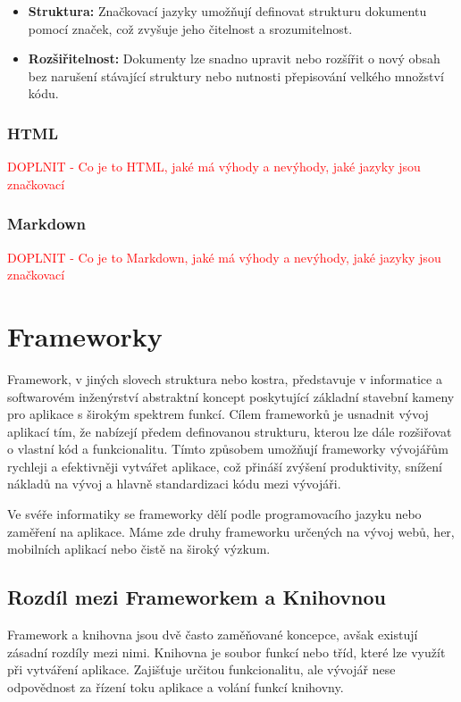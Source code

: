 \begin{itemize}
    \item \textbf{Struktura:} Značkovací jazyky umožňují definovat strukturu dokumentu pomocí značek, což zvyšuje jeho čitelnost a srozumitelnost.
    \item \textbf{Rozšiřitelnost:} Dokumenty lze snadno upravit nebo rozšířit o nový obsah bez narušení stávající struktury nebo nutnosti přepisování velkého množství kódu.
\end{itemize}

\subsubsection{HTML}
\label{subsubsec:languages-markup-html}
\textcolor{red}{DOPLNIT - Co je to HTML, jaké má výhody a nevýhody, jaké jazyky jsou značkovací}

\subsubsection{Markdown}
\label{subsubsec:languages-markup-markdown}
\textcolor{red}{DOPLNIT - Co je to Markdown, jaké má výhody a nevýhody, jaké jazyky jsou značkovací}

\section{Frameworky}
\label{sec:dev-framework}
Framework, v jiných slovech struktura nebo kostra, představuje v informatice a softwarovém inženýrství abstraktní koncept poskytující základní stavební kameny pro aplikace s širokým spektrem funkcí. Cílem frameworků je usnadnit vývoj aplikací tím, že nabízejí předem definovanou strukturu, kterou lze dále rozšiřovat o vlastní kód a funkcionalitu. Tímto způsobem umožňují frameworky vývojářům rychleji a efektivněji vytvářet aplikace, což přináší zvýšení produktivity, snížení nákladů na vývoj a hlavně standardizaci kódu mezi vývojáři.

Ve svéře informatiky se frameworky dělí podle programovacího jazyku nebo zaměření na aplikace. Máme zde druhy frameworku určených na vývoj webů, her, mobilních aplikací nebo čistě na široký výzkum. \cite{about_framework}

\subsection*{Rozdíl mezi Frameworkem a Knihovnou}
Framework a knihovna jsou dvě často zaměňované koncepce, avšak existují zásadní rozdíly mezi nimi. Knihovna je soubor funkcí nebo tříd, které lze využít při vytváření aplikace. Zajišťuje určitou funkcionalitu, ale vývojář nese odpovědnost za řízení toku aplikace a volání funkcí knihovny.

